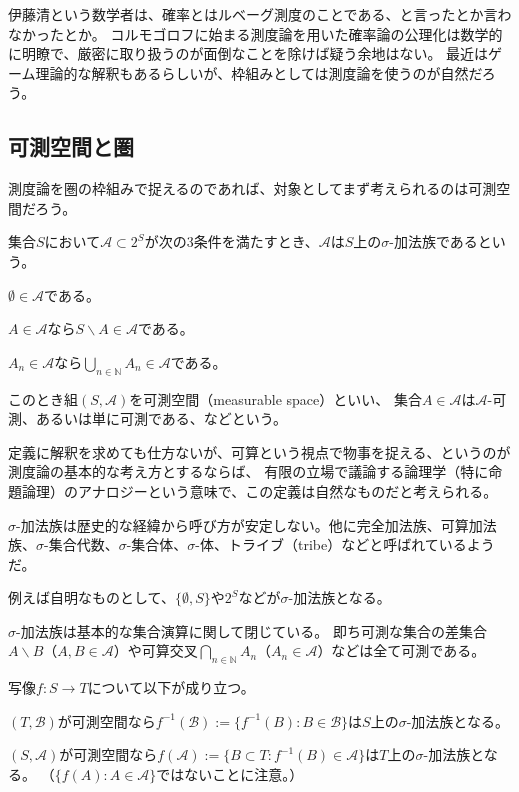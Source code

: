 \documentclass[../root.tex]{subfiles}
\begin{document}
伊藤清という数学者は、確率とはルベーグ測度のことである、と言ったとか言わなかったとか。
コルモゴロフに始まる測度論を用いた確率論の公理化は数学的に明瞭で、厳密に取り扱うのが面倒なことを除けば疑う余地はない。
最近はゲーム理論的な解釈もあるらしいが、枠組みとしては測度論を使うのが自然だろう。




\subsection{可測空間と圏}
測度論を圏の枠組みで捉えるのであれば、対象としてまず考えられるのは可測空間だろう。

\begin{Def}{}{}
集合$ S $において$ \mathscr{A}\subset 2^{S} $が次の3条件を満たすとき、$ \mathscr{A} $は$ S $上の$ \sigma $-加法族であるという。
\begin{EnumCond}
\item $ \emptyset\in\mathscr{A} $である。
\item $ A\in\mathscr{A} $なら$ S\backslash A\in\mathscr{A} $である。
\item $ A_{n}\in\mathscr{A} $なら$ \bigcup_{n\in\mathbb{N}}A_{n}\in\mathscr{A} $である。
\end{EnumCond}

このとき組$ ( S, \mathscr{A} ) $を可測空間（measurable space）といい、
集合$ A\in\mathscr{A} $は$ \mathscr{A} $-可測、あるいは単に可測である、などという。
\end{Def}

定義に解釈を求めても仕方ないが、可算という視点で物事を捉える、というのが測度論の基本的な考え方とするならば、
有限の立場で議論する論理学（特に命題論理）のアナロジーという意味で、この定義は自然なものだと考えられる。

$ \sigma $-加法族は歴史的な経緯から呼び方が安定しない。他に完全加法族、可算加法族、$ \sigma $-集合代数、$ \sigma $-集合体、$ \sigma $-体、トライブ（tribe）などと呼ばれているようだ。

例えば自明なものとして、$ \lbrace \emptyset, S \rbrace $や$ 2^{S} $などが$ \sigma $-加法族となる。

$ \sigma $-加法族は基本的な集合演算に関して閉じている。
即ち可測な集合の差集合$ A\backslash B $（$ A, B\in\mathscr{A} $）や可算交叉$ \bigcap_{n\in\mathbb{N}}A_{n} $（$ A_{n}\in\mathscr{A} $）などは全て可測である。

\begin{Prop}{}{}
写像$ f\colon S\rightarrow T $について以下が成り立つ。
\begin{EnumCond}
\item $ ( T, \mathscr{B} ) $が可測空間なら$ f^{-1}( \mathscr{B} ):=\lbrace f^{-1}( B ) : B\in\mathscr{B} \rbrace $は$ S $上の$ \sigma $-加法族となる。
\item $ ( S, \mathscr{A} ) $が可測空間なら$ f( \mathscr{A} ):=\lbrace B\subset T : f^{-1}( B )\in\mathscr{A} \rbrace $は$ T $上の$ \sigma $-加法族となる。
（$ \lbrace f( A ) : A\in\mathscr{A} \rbrace $ではないことに注意。）
\end{EnumCond}
\end{Prop}
\end{document}
